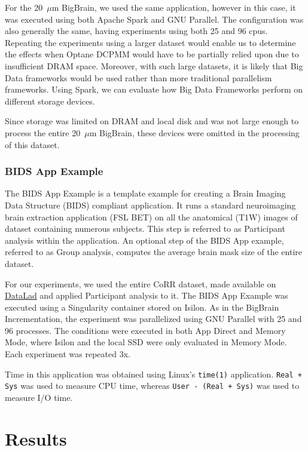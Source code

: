 \documentclass[conference]{IEEEtran}
\newcommand{\bigbrain}{BigBrain\xspace}
\begin{document}
For the 20~$\mu$m \bigbrain, we used the same application, however in this case, it was executed
using both Apache Spark and GNU Parallel. The configuration was also generally the same, having 
experiments using both 25 and 96 cpus. Repeating the experiments using a larger dataset would enable
us to determine the effects when Optane DCPMM would have to be partially relied upon due to insufficient DRAM
space. Moreover, with such large datasets, it is likely that Big Data frameworks would be used rather than
more traditional parallelism frameworks. Using Spark, we can evaluate how Big Data Frameworks perform on
different storage devices.

Since storage was limited on DRAM and local disk and was not large enough to process the entire
20~$\mu$m \bigbrain, these devices were omitted in the processing of this dataset. 

\subsubsection{BIDS App Example}

The BIDS App Example is a template example for creating a Brain Imaging Data Structure (BIDS)
compliant application. It runs a standard neuroimaging brain extraction application (FSL BET) 
on all the anatomical (T1W) images of dataset containing numerous subjects. This step is 
referred to as Participant analysis within the application. An optional
step of the BIDS App example, referred to as Group analysis, computes the average brain
mask size of the entire dataset.

For our experiments, we used the entire CoRR dataset, made available on \href{}{DataLad} and
applied Participant analysis to it. The BIDS App Example was executed using a Singularity container stored on
Isilon. As in the BigBrain Incrementation, the experiment was parallelized 
using GNU Parallel with 25 and 96 processes. The conditions were executed in both App Direct and Memory Mode,
where Isilon and the local SSD were only evaluated in Memory Mode. Each experiment was repeated 3x.

Time in this application was obtained using Linux's \texttt{time(1)} application.
\texttt{Real + Sys} was used to measure CPU time,
whereas \texttt{User - (Real + Sys)} was used to measure
I/O time.
\section{Results}
\end{document}

